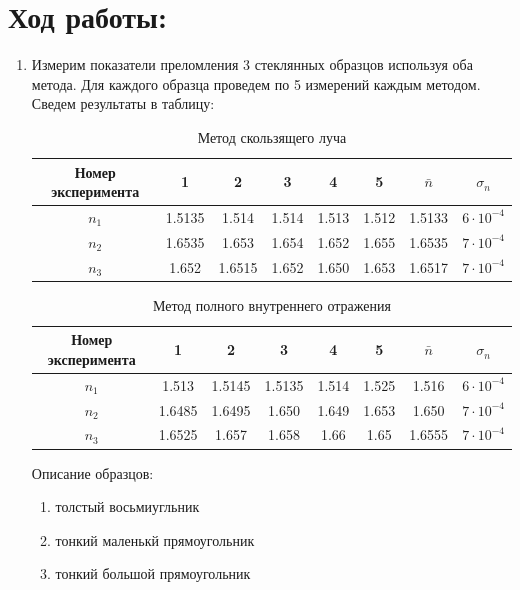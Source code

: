 \documentclass[12pt]{article}
\begin{document}
\section*{Ход работы:}
\begin{enumerate}
    \item Измерим показатели преломления 3 стеклянных образцов используя оба метода. Для каждого образца проведем по 5 измерений каждым методом. Сведем результаты в таблицу:
    
    \begin{table}[h!]
        \centering
        \begin{tabular}{| c | c | c | c | c | c | c | c |} 
            \hline
            Номер эксперимента & 1 & 2 & 3 & 4 & 5 & $\bar{n}$ & $\sigma_n$ \\
            \hline
            $n_1$ & 1.5135 & 1.514 & 1.514 & 1.513 & 1.512 & 1.5133 & $6 \cdot 10^{-4}$ \\
            \hline
            $n_2$ & 1.6535 & 1.653 & 1.654 & 1.652 & 1.655 & 1.6535 & $7 \cdot 10^{-4}$ \\
            \hline
            $n_3$ & 1.652 & 1.6515 & 1.652 & 1.650 & 1.653 & 1.6517 & $7 \cdot 10^{-4}$ \\
            \hline
        \end{tabular}
        \caption{Метод скользящего луча}
    \end{table}   
    
    \begin{table}[h!]
        \centering
        \begin{tabular}{| c | c | c | c | c | c | c | c |} 
            \hline
            Номер эксперимента & 1 & 2 & 3 & 4 & 5 & $\bar{n}$ & $\sigma_n$ \\
            \hline
            $n_1$ & 1.513 & 1.5145 & 1.5135 & 1.514 & 1.525 & 1.516 & $6 \cdot 10^{-4}$ \\
            \hline
            $n_2$ & 1.6485 & 1.6495 & 1.650 & 1.649 & 1.653 & 1.650 & $7 \cdot 10^{-4}$ \\
            \hline
            $n_3$ & 1.6525 & 1.657 & 1.658 & 1.66 & 1.65 & 1.6555 & $7 \cdot 10^{-4}$ \\
            \hline
        \end{tabular}
        \caption{Метод полного внутреннего отражения}
    \end{table} 
    
    Описание образцов:
    \begin{enumerate}
        \item толстый восьмиугльник
        \item тонкий маленькй прямоугольник
        \item тонкий большой прямоугольник
    \end{enumerate}


\end{enumerate}
\end{document}
